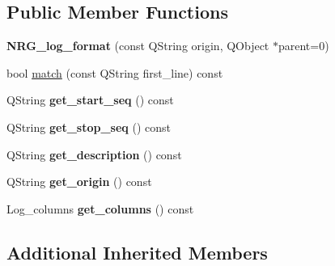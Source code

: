 \subsection*{Public Member Functions}
\begin{DoxyCompactItemize}
\item 
\hypertarget{struct_log__viewer_1_1_n_r_g__log__format_aa1c60c8059b20a6f9c958450e9f19a50}{{\bfseries N\-R\-G\-\_\-log\-\_\-format} (const Q\-String origin, Q\-Object $\ast$parent=0)}\label{struct_log__viewer_1_1_n_r_g__log__format_aa1c60c8059b20a6f9c958450e9f19a50}

\item 
bool \hyperlink{struct_log__viewer_1_1_n_r_g__log__format_a32d9e5e346b1fabce16b8c680de2d4de}{match} (const Q\-String first\-\_\-line) const 
\item 
\hypertarget{struct_log__viewer_1_1_n_r_g__log__format_a77b2f35c1b5cdd36db1e2c15ef7e97a2}{Q\-String {\bfseries get\-\_\-start\-\_\-seq} () const }\label{struct_log__viewer_1_1_n_r_g__log__format_a77b2f35c1b5cdd36db1e2c15ef7e97a2}

\item 
\hypertarget{struct_log__viewer_1_1_n_r_g__log__format_a51cc946fb782eeb6bed0a8230d6dc634}{Q\-String {\bfseries get\-\_\-stop\-\_\-seq} () const }\label{struct_log__viewer_1_1_n_r_g__log__format_a51cc946fb782eeb6bed0a8230d6dc634}

\item 
\hypertarget{struct_log__viewer_1_1_n_r_g__log__format_a655a48f686373f89b3ea4814a6cf7d49}{Q\-String {\bfseries get\-\_\-description} () const }\label{struct_log__viewer_1_1_n_r_g__log__format_a655a48f686373f89b3ea4814a6cf7d49}

\item 
\hypertarget{struct_log__viewer_1_1_n_r_g__log__format_ab5f59f53dc62cceb39bfd661ca702971}{Q\-String {\bfseries get\-\_\-origin} () const }\label{struct_log__viewer_1_1_n_r_g__log__format_ab5f59f53dc62cceb39bfd661ca702971}

\item 
\hypertarget{struct_log__viewer_1_1_n_r_g__log__format_a3b85740cec7a649f3c053c1ce6e3246d}{Log\-\_\-columns {\bfseries get\-\_\-columns} () const }\label{struct_log__viewer_1_1_n_r_g__log__format_a3b85740cec7a649f3c053c1ce6e3246d}

\end{DoxyCompactItemize}
\subsection*{Additional Inherited Members}


